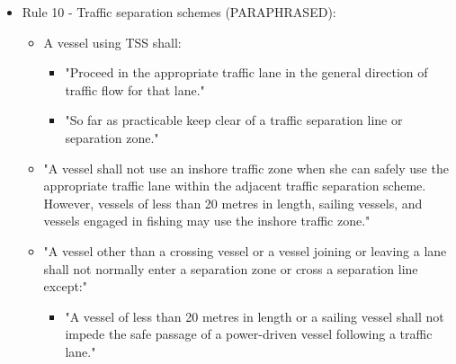 \begin{itemize}
        \item Rule 10 - Traffic separation schemes (PARAPHRASED):
        
            \begin{itemize}
                \item A vessel using \ac{TSS} shall:
                \begin{itemize}
                    \item "Proceed in the appropriate traffic lane in the general direction of traffic flow for that lane."
                    \item "So far as practicable keep clear of a traffic separation line or separation zone."
                \end{itemize}
                
                \item "A vessel shall not use an inshore traffic zone when she can safely use the appropriate traffic lane within the adjacent traffic separation scheme. However, vessels of less than 20 metres in length, sailing vessels, and vessels engaged in fishing may use the inshore traffic zone." 
        
                \item "A vessel other than a crossing vessel or a vessel joining or leaving a lane shall not normally enter a separation zone or cross a separation line except:" 
                \begin{itemize}
                    \item "A vessel of less than 20 metres in length or a sailing vessel shall not impede the safe passage of a power-driven vessel following a traffic lane."          
                \end{itemize}
            \end{itemize}
            

\end{itemize}
